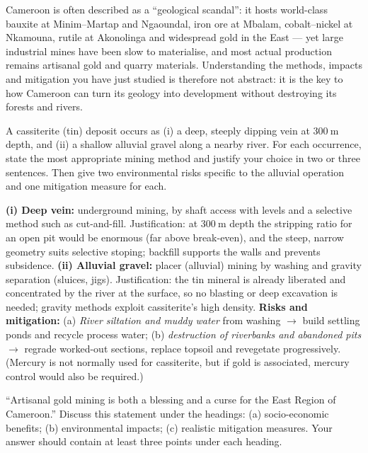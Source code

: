 \documentclass[11pt]{article}
\begin{document}
\begin{savaistu}
Cameroon is often described as a ``geological scandal'': it hosts world-class bauxite at Minim--Martap and Ngaoundal, iron ore at Mbalam, cobalt--nickel at Nkamouna, rutile at Akonolinga and widespread gold in the East --- yet large industrial mines have been slow to materialise, and most actual production remains artisanal gold and quarry materials. Understanding the methods, impacts and mitigation you have just studied is therefore not abstract: it is the key to how Cameroon can turn its geology into development without destroying its forests and rivers.
\end{savaistu}

\begin{exercice}
A cassiterite (tin) deposit occurs as (i) a deep, steeply dipping vein at $300\ \mathrm{m}$ depth, and (ii) a shallow alluvial gravel along a nearby river. For each occurrence, state the most appropriate mining method and justify your choice in two or three sentences. Then give two environmental risks specific to the alluvial operation and one mitigation measure for each.
\end{exercice}

\begin{corrige}[Exercise 1]
\textbf{(i) Deep vein:} underground mining, by shaft access with levels and a selective method such as cut-and-fill. Justification: at $300\ \mathrm{m}$ depth the stripping ratio for an open pit would be enormous (far above break-even), and the steep, narrow geometry suits selective stoping; backfill supports the walls and prevents subsidence.
\textbf{(ii) Alluvial gravel:} placer (alluvial) mining by washing and gravity separation (sluices, jigs). Justification: the tin mineral is already liberated and concentrated by the river at the surface, so no blasting or deep excavation is needed; gravity methods exploit cassiterite's high density.
\textbf{Risks and mitigation:} (a) \emph{River siltation and muddy water} from washing $\rightarrow$ build settling ponds and recycle process water; (b) \emph{destruction of riverbanks and abandoned pits} $\rightarrow$ regrade worked-out sections, replace topsoil and revegetate progressively. (Mercury is not normally used for cassiterite, but if gold is associated, mercury control would also be required.)
\end{corrige}

\begin{exercice}
``Artisanal gold mining is both a blessing and a curse for the East Region of Cameroon.'' Discuss this statement under the headings: (a) socio-economic benefits; (b) environmental impacts; (c) realistic mitigation measures. Your answer should contain at least three points under each heading.
\end{exercice}
\end{document}
